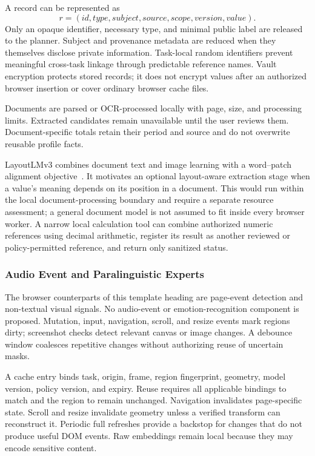\documentclass[conference]{IEEEtran}
\begin{document}
A record can be represented as
\begin{equation}
 r=(id,type,subject,source,scope,version,value).
\end{equation}
Only an opaque identifier, necessary type, and minimal public label are released to the planner. Subject and provenance metadata are reduced when they themselves disclose private information. Task-local random identifiers prevent meaningful cross-task linkage through predictable reference names. Vault encryption protects stored records; it does not encrypt values after an authorized browser insertion or cover ordinary browser cache files.

Documents are parsed or OCR-processed locally with page, size, and processing limits. Extracted candidates remain unavailable until the user reviews them. Document-specific totals retain their period and source and do not overwrite reusable profile facts.

LayoutLMv3 combines document text and image learning with a word--patch alignment objective~\cite{layoutlm}. It motivates an optional layout-aware extraction stage when a value's meaning depends on its position in a document. This would run within the local document-processing boundary and require a separate resource assessment; a general document model is not assumed to fit inside every browser worker. A narrow local calculation tool can combine authorized numeric references using decimal arithmetic, register its result as another reviewed or policy-permitted reference, and return only sanitized status.

\subsubsection{Audio Event and Paralinguistic Experts}
The browser counterparts of this template heading are page-event detection and non-textual visual signals. No audio-event or emotion-recognition component is proposed. Mutation, input, navigation, scroll, and resize events mark regions dirty; screenshot checks detect relevant canvas or image changes. A debounce window coalesces repetitive changes without authorizing reuse of uncertain masks.

A cache entry binds task, origin, frame, region fingerprint, geometry, model version, policy version, and expiry. Reuse requires all applicable bindings to match and the region to remain unchanged. Navigation invalidates page-specific state. Scroll and resize invalidate geometry unless a verified transform can reconstruct it. Periodic full refreshes provide a backstop for changes that do not produce useful DOM events. Raw embeddings remain local because they may encode sensitive content.
\end{document}
